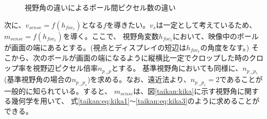 \begin{figure}[h]
  \begin{center}
  \caption{視野角の違いによるポール間ピクセル数の違い}
  \label{taikan:px}
  \end{center}
\end{figure}

次に、$v_{sense}=f(h_{fov_v})$となる$f$を導きたい。$v_s$は一定として考えているため、$m_{sense}=f(h_{fov_v})$を導く。ここで、
視野角変数$h_{fov_v}$において、映像中のボールが画面の端にあるとする。(視点とディスプレイの短辺は$h_{fov_v}$の角度をなす。)
そこから、次のボールが画面の端になるように縦横比一定でクロップした時のクロップ率を視野辺ピクセル倍率$n_{p_{\to}p}$とする。
基準視野角においても同様に、$n_{p_{\to}p_s}$(基準視野角の場合の$n_{p_{\to}p_s}$)を求める。なお、遠近法より、$n_{p_{\to}p_s} = 2$であることが一般的に知られている。すると、
$m_{sense}$は、図\ref{taikan:kika}に示す視野角に関する幾何学を用いて、
式\eqref{taikan:eq:kika1}\verb|～|\eqref{taikan:eq:kika3}のように求めることができる。


